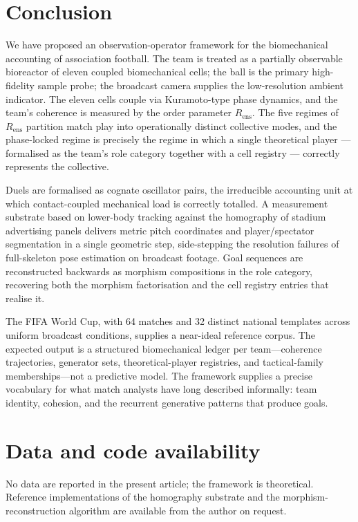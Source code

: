 \documentclass[11pt,twocolumn,a4paper]{article}
\theoremstyle{definition}
\theoremstyle{remark}
\newcommand{\Rens}{R_{\mathrm{ens}}}
\begin{document}
\section{Conclusion}

We have proposed an observation-operator framework for the biomechanical
accounting of association football. The team is treated as a partially
observable bioreactor of eleven coupled biomechanical cells; the ball is
the primary high-fidelity sample probe; the broadcast camera supplies
the low-resolution ambient indicator. The eleven cells couple via
Kuramoto-type phase dynamics, and the team's coherence is measured by
the order parameter $\Rens$. The five regimes of $\Rens$ partition match
play into operationally distinct collective modes, and the phase-locked
regime is precisely the regime in which a single theoretical player ---
formalised as the team's role category together with a cell registry ---
correctly represents the collective.

Duels are formalised as cognate oscillator pairs, the irreducible
accounting unit at which contact-coupled mechanical load is correctly
totalled. A measurement substrate based on lower-body tracking against
the homography of stadium advertising panels delivers metric pitch
coordinates and player/spectator segmentation in a single geometric
step, side-stepping the resolution failures of full-skeleton pose
estimation on broadcast footage. Goal sequences are reconstructed
backwards as morphism compositions in the role category, recovering
both the morphism factorisation and the cell registry entries that
realise it.

The FIFA World Cup, with 64 matches and 32 distinct national templates
across uniform broadcast conditions, supplies a near-ideal reference
corpus. The expected output is a structured biomechanical ledger per
team---coherence trajectories, generator sets, theoretical-player
registries, and tactical-family memberships---not a predictive model.
The framework supplies a precise vocabulary for what match analysts
have long described informally: team identity, cohesion, and the
recurrent generative patterns that produce goals.

\section*{Data and code availability}

No data are reported in the present article; the framework is
theoretical. Reference implementations of the homography substrate and
the morphism-reconstruction algorithm are available from the author
on request.



\end{document}
